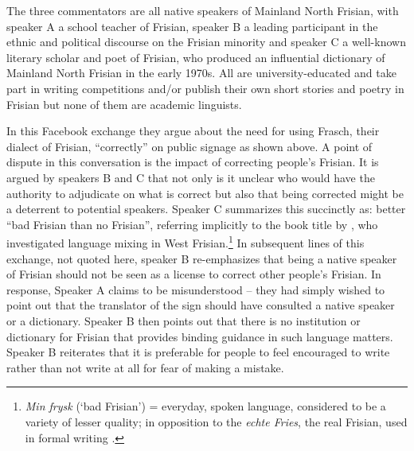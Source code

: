 \documentclass[output=paper]{langsci/langscibook}
\begin{document}
The three commentators are all native speakers of Mainland North Frisian, with speaker A a school teacher of Frisian, speaker B a leading participant in the ethnic and political discourse on the Frisian minority and speaker C a well-known literary scholar and poet of Frisian, who produced an influential dictionary of Mainland North Frisian in the early 1970s. All are university-educated and take part in writing competitions and/or publish their own short stories and poetry in Frisian but none of them are academic linguists.\par 
In this Facebook exchange they argue about the need for using Frasch, their dialect of Frisian, “correctly” on public signage as shown above. A point of dispute in this conversation is the impact of correcting people’s Frisian. It is argued by speakers B and C that not only is it unclear who would have the authority to adjudicate on what is correct but also that being corrected might be a deterrent to potential speakers. Speaker C summarizes this succinctly as: better “bad Frisian than no Frisian”, referring implicitly to the book title by \citep{Sjolin1976}, who investigated language mixing in West Frisian.\footnote{\textit{Min frysk} (‘bad Frisian’) = everyday, spoken language, considered to be a variety of lesser quality; in opposition to the \textit{echte Fries}, the real Frisian, used in formal writing \citep[13]{Sjolin1976}.} In subsequent lines of this exchange, not quoted here, speaker B re-emphasizes that being a native speaker of Frisian should not be seen as a license to correct other people’s Frisian. In response, Speaker A claims to be misunderstood – they had simply wished to point out that the translator of the sign should have consulted a native speaker or a dictionary. Speaker B then points out that there is no institution or dictionary for Frisian that provides binding guidance in such language matters. Speaker B reiterates that it is preferable for people to feel encouraged to write rather than not write at all for fear of making a mistake.
\end{document}

